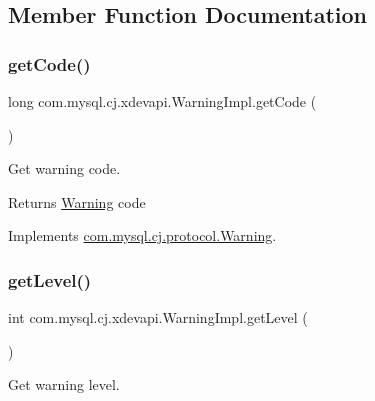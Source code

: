 \subsection{Member Function Documentation}
\mbox{\label{classcom_1_1mysql_1_1cj_1_1xdevapi_1_1_warning_impl_a4e36aba92d49db5855897c8a26ffce06}} 
\subsubsection{\texorpdfstring{get\+Code()}{getCode()}}
{\footnotesize\ttfamily long com.\+mysql.\+cj.\+xdevapi.\+Warning\+Impl.\+get\+Code (\begin{DoxyParamCaption}{ }\end{DoxyParamCaption})}

Get warning code.

\begin{DoxyReturn}{Returns}
\mbox{\hyperlink{interfacecom_1_1mysql_1_1cj_1_1xdevapi_1_1_warning}{Warning}} code 
\end{DoxyReturn}


Implements \mbox{\hyperlink{interfacecom_1_1mysql_1_1cj_1_1protocol_1_1_warning_a2cce849fce9ca14b8e1d673a24b4d1d2}{com.\+mysql.\+cj.\+protocol.\+Warning}}.

\mbox{\label{classcom_1_1mysql_1_1cj_1_1xdevapi_1_1_warning_impl_abc0fcf3e60763b3d3ce1b7126be22f61}} 
\subsubsection{\texorpdfstring{get\+Level()}{getLevel()}}
{\footnotesize\ttfamily int com.\+mysql.\+cj.\+xdevapi.\+Warning\+Impl.\+get\+Level (\begin{DoxyParamCaption}{ }\end{DoxyParamCaption})}

Get warning level.

